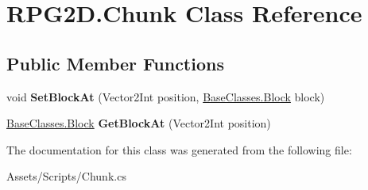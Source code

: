 \hypertarget{class_r_p_g2_d_1_1_chunk}{}\section{R\+P\+G2\+D.\+Chunk Class Reference}
\label{class_r_p_g2_d_1_1_chunk}
\subsection*{Public Member Functions}
\begin{DoxyCompactItemize}
\item 
\mbox{\label{class_r_p_g2_d_1_1_chunk_ade799c25f41b12c842cdf3fd2e59183b}} 
void {\bfseries Set\+Block\+At} (Vector2\+Int position, \mbox{\hyperlink{class_r_p_g2_d_1_1_base_classes_1_1_block}{Base\+Classes.\+Block}} block)
\item 
\mbox{\label{class_r_p_g2_d_1_1_chunk_a252a3f5d169d358d1f179b0909836c47}} 
\mbox{\hyperlink{class_r_p_g2_d_1_1_base_classes_1_1_block}{Base\+Classes.\+Block}} {\bfseries Get\+Block\+At} (Vector2\+Int position)
\end{DoxyCompactItemize}


The documentation for this class was generated from the following file\+:\begin{DoxyCompactItemize}
\item 
Assets/\+Scripts/Chunk.\+cs\end{DoxyCompactItemize}
